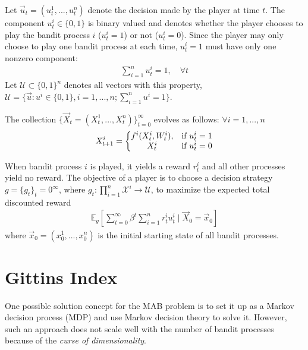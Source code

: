 \documentclass[11pt]{elegantbook}
\begin{document}
Let $\vec{u}_t=(u_t^1,...,u_t^n)$ denote the decision
made by the player at time $t$. The component $u_t^i\in\{0,1\}$ is binary valued and denotes
whether the player chooses to play the bandit
process $i$ ($u_t^i = 1$) or not ($u_t^i = 0$). Since
the player may only choose to play one bandit process at each time, $u_t^i = 1$ must have only one nonzero component:
\begin{equation}
    \begin{aligned}
        \sum_{i=1}^n u_t^i = 1,\quad \forall t
    \end{aligned}
    \nonumber
\end{equation}
Let $\mathcal{U}\subset \{0,1\}^n$ denotes all vectors with this property, $\mathcal{U}=\{\vec{u}:u^i\in\{0,1\},i=1,...,n; \sum_{i=1}^n u^i = 1\}$.

The collection $\{\vec{X}_t=(X_t^1,...,X_t^n)\}_{t=0}^\infty$ evolves as follows: $\forall i=1,...,n$
\begin{equation}
    \begin{aligned}
        X_{t+1}^i=\left\{\begin{matrix}
            f^i(X_t^i,W_t^i),&\textnormal{if }u_t^i=1\\
            X_t^i&\textnormal{if }u_t^i=0
        \end{matrix}\right.
    \end{aligned}
    \nonumber
\end{equation}

When bandit process $i$ is played, it yields a reward $r^i_t$ and all other processes yield no reward.
The objective of a player is to choose a decision strategy $g=\{g_t\}_t=0^\infty$, where $g_t:\prod_{i=1}^n \mathcal{X}^i \rightarrow \mathcal{U}$, to maximize the expected total discounted
reward
\begin{equation}
    \begin{aligned}
        \mathbb{E}_g\left[\sum_{t=0}^\infty \beta^t\sum_{i=1}^nr^i_t u_t^i\mid \vec{X}_0=\vec{x}_0\right]
    \end{aligned}
    \nonumber
\end{equation}
where $\vec{x}_0=(x_0^1,...,x_0^n)$ is the initial starting state of all bandit processes.

\section{Gittins Index}
One possible solution concept for the MAB
problem is to set it up as a Markov decision process (MDP) and use Markov decision theory to solve it. However, such an approach does not scale well with the number of bandit processes because of the \textit{curse of dimensionality}.
\end{document}
